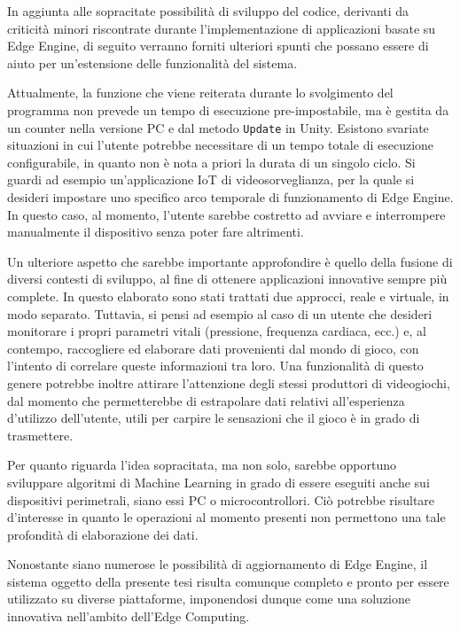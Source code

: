 In aggiunta alle sopracitate possibilità di sviluppo del codice, derivanti da criticità minori riscontrate durante l’implementazione di applicazioni basate su Edge Engine, di seguito verranno forniti ulteriori spunti che possano essere di aiuto per un’estensione delle funzionalità del sistema.

Attualmente, la funzione che viene reiterata durante lo svolgimento del programma non prevede un tempo di esecuzione pre-impostabile, ma è gestita da un counter nella versione PC e dal metodo \texttt{Update} in Unity. Esistono svariate situazioni in cui l’utente potrebbe necessitare di un tempo totale di esecuzione configurabile, in quanto non è nota a priori la durata di un singolo ciclo. Si guardi ad esempio un’applicazione IoT di videosorveglianza, per la quale si desideri impostare uno specifico arco temporale di funzionamento di Edge Engine. In questo caso, al momento, l’utente sarebbe costretto ad avviare e interrompere manualmente il dispositivo senza poter fare altrimenti.

Un ulteriore aspetto che sarebbe importante approfondire è quello della fusione di diversi contesti di sviluppo, al fine di ottenere applicazioni innovative sempre più complete. In questo elaborato sono stati trattati due approcci, reale e virtuale, in modo separato. Tuttavia, si pensi ad esempio al caso di un utente che desideri monitorare i propri parametri vitali (pressione, frequenza cardiaca, ecc.) e, al contempo, raccogliere ed elaborare dati provenienti dal mondo di gioco, con l’intento di correlare queste informazioni tra loro. Una funzionalità di questo genere potrebbe inoltre attirare l’attenzione degli stessi produttori di videogiochi, dal momento che permetterebbe di estrapolare dati relativi all'esperienza d’utilizzo dell'utente, utili per carpire le sensazioni che il gioco è in grado di trasmettere.

Per quanto riguarda l’idea sopracitata, ma non solo, sarebbe opportuno sviluppare algoritmi di Machine Learning in grado di essere eseguiti anche sui dispositivi perimetrali, siano essi PC o microcontrollori. Ciò potrebbe risultare d’interesse in quanto le operazioni al momento presenti non permettono una tale profondità di elaborazione dei dati.

Nonostante siano numerose le possibilità di aggiornamento di Edge Engine, il sistema oggetto della presente tesi risulta comunque completo e pronto per essere utilizzato su diverse piattaforme, imponendosi dunque come una soluzione innovativa nell'ambito dell'Edge Computing.
